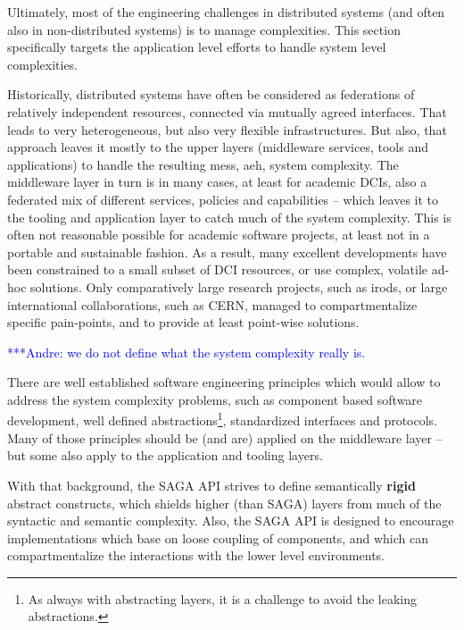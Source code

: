 \documentclass[a4paper,12pt]{article}
\newcommand{\amnote}[1]{   {\textcolor{blue} { ***Andre:    #1 }}}
\newcommand{\amnote}[1]{}
\newcommand{\B}[1]{\textbf{#1}}
\begin{document}

    Ultimately, most of the engineering challenges in distributed
    systems (and often also in non-distributed systems) is to manage
    complexities.  This section specifically targets the application
    level efforts to handle system level complexities.

    Historically, distributed systems have often be considered as
    federations of relatively independent resources, connected via
    mutually agreed interfaces.  That leads to very heterogeneous, but
    also very flexible infrastructures.  But also, that approach
    leaves it mostly to the upper layers (middleware services, tools
    and applications) to handle the resulting mess, aeh, system
    complexity.  The middleware layer in turn is in many cases, at
    least for academic DCIs, also a federated mix of different
    services, policies and capabilities -- which leaves it to the
    tooling and application layer to catch much of the system
    complexity.  This is often not reasonable possible for academic
    software projects, at least not in a portable and sustainable
    fashion.  As a result, many excellent developments have been
    constrained to a small subset of DCI resources, or use complex,
    volatile ad-hoc solutions.  Only comparatively large research
    projects, such as irods, or large international collaborations,
    such as CERN, managed to compartmentalize specific pain-points,
    and to provide at least point-wise solutions.

    \amnote{we do not define what the system complexity really is.}

    There are well established software engineering principles which
    would allow to address the system complexity problems, such as
    component based software development, well defined
    abstractions\footnote{As always with abstracting layers, it is a
    challenge to avoid the leaking abstractions.}, standardized
    interfaces and protocols.  Many of those principles should be (and
    are) applied on the middleware layer -- but some also apply to the
    application and tooling layers.  

    With that background, the SAGA API strives to define semantically
    \B{rigid} abstract constructs, which shields higher (than SAGA)
    layers from much of the syntactic and semantic complexity.  Also,
    the SAGA API is designed to encourage implementations which base
    on loose coupling of components, and which can compartmentalize
    the interactions with the lower level environments.
\end{document}
